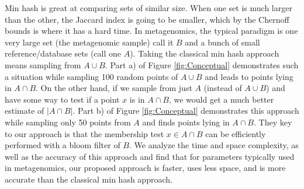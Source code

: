 \documentclass[11pt]{amsart}
\theoremstyle{remark}
\numberwithin{equation}{section}
\begin{document}
Min hash is great at comparing sets of similar size. When one set is much larger than the other, the Jaccard index is going to be smaller, which by the Chernoff bounds is where it has a hard time. In metagenomics, the typical paradigm is one very large set (the metagenomic sample) call it $B$ and a bunch of small reference/database sets (call one $A$). Taking the classical min hash approach means sampling from $A\cup B$. Part a) of Figure \ref{fig:Conceptual} demonstrates such a situation while sampling 100 random points of $A\cup B$ and leads to points lying in $A\cap B$. On the other hand, if we sample from just $A$ (instead of $A\cup B$) and have some way to test if a point $x$ is in $A\cap B$, we would get a much better estimate of $|A\cap B|$. Part b) of Figure \ref{fig:Conceptual} demonstrates this approach while sampling only 50 points from $A$ and finds points lying in $A\cap B$. They key to our approach is that the membership test $x\in A\cap B$ can be efficiently performed with a bloom filter of $B$. We analyze the time and space complexity, as well as the accuracy of this approach and find that for parameters typically used in metagenomics, our proposed approach is faster, uses less space, and is more accurate than the classical min hash approach.
\end{document}
